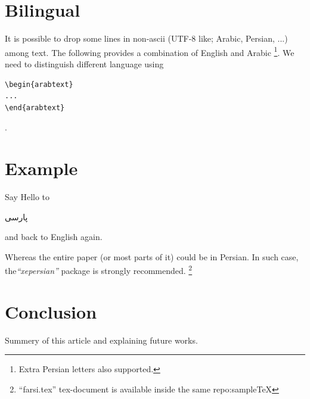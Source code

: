 \documentclass[twocolumn]{article} %
\begin{document}
\section{Bilingual}
It is possible to drop some lines in non-ascii (UTF-8 like; Arabic, Persian,
...) among text. The following provides a combination of English and Arabic
\footnote {Extra Persian letters also supported.}. We need to distinguish
different language using
\begin{verbatim}
\begin{arabtext}
...
\end{arabtext}
\end{verbatim}.
\section*{Example}
Say Hello to
\begin{arabtext}
پارسی
\end{arabtext}
and back to English again.

Whereas the entire paper (or most parts of it) could be in Persian. In such
case, the\textit{``xepersian''} package is strongly recommended.
\footnote{``farsi.tex'' tex-document is available inside the same
repo:sampleTeX}
\section{Conclusion}
Summery of this article and explaining future works.


\end{document}
